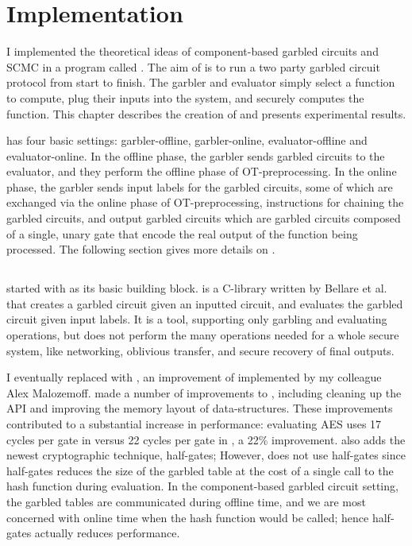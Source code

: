 
\chapter{Implementation}

I implemented the theoretical ideas of component-based garbled circuits and SCMC in a program called \CompGC. 
The aim of \CompGC is to run a two party garbled circuit protocol from start to finish. 
The garbler and evaluator simply select a function to compute, plug their inputs into the system, and \CompGC securely computes the function.
This chapter describes the creation of \CompGC and presents experimental results. 

\CompGC has four basic settings: garbler-offline, garbler-online, evaluator-offline and evaluator-online.
In the offline phase, the garbler sends garbled circuits to the evaluator, and they perform the offline phase of OT-preprocessing.
In the online phase, the garbler sends input labels for the garbled circuits, some of which are exchanged via the online phase of OT-preprocessing, instructions for chaining the garbled circuits, and output garbled circuits which are garbled circuits composed of a single, unary gate that encode the real output of the function being processed.
The following section gives more details on \CompGC.

\section{\CompGC}
\CompGC started with \JustGarble as its basic building block.
\JustGarble is a C-library written by Bellare et al. \cite{justgarble} that creates a garbled circuit given an inputted circuit, and evaluates the garbled circuit given input labels. 
It is a tool, supporting only garbling and evaluating operations, but does not perform the many operations needed for a whole secure system, like networking, oblivious transfer, and secure recovery of final outputs. 

I eventually replaced \JustGarble with \LibGarble, an improvement of \JustGarble implemented by my colleague Alex Malozemoff.
\LibGarble made a number of improvements to \JustGarble, including cleaning up the API and improving the memory layout of  data-structures.
These improvements contributed to a substantial increase in performance: evaluating AES uses 17 cycles per gate in \LibGarble versus 22 cycles per gate in \JustGarble, a 22\% improvement. 
\LibGarble also adds the newest cryptographic technique, half-gates; However, \CompGC does not use half-gates since half-gates reduces the size of the garbled table at the cost of a single call to the hash function during evaluation. 
In the component-based garbled circuit setting, the garbled tables are communicated during offline time, and we are most concerned with online time when the hash function would be called; hence half-gates actually reduces performance.


